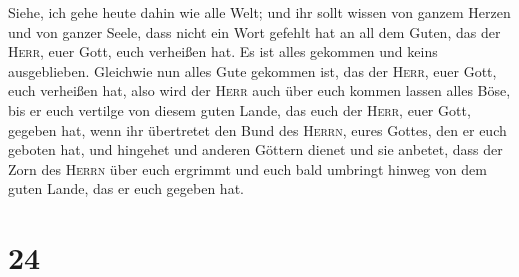 Siehe, ich gehe heute dahin wie alle Welt; und ihr sollt
wissen von ganzem Herzen und von ganzer Seele, dass nicht ein Wort
gefehlt hat an all dem Guten, das der \textsc{Herr}, euer Gott, euch
verheißen hat. Es ist alles gekommen und keins ausgeblieben.
 Gleichwie nun alles Gute gekommen ist, das der
\textsc{Herr}, euer Gott, euch verheißen hat, also wird der
\textsc{Herr} auch über euch kommen lassen alles Böse, bis er euch
vertilge von diesem guten Lande, das euch der \textsc{Herr}, euer Gott,
gegeben hat,  wenn ihr übertretet den Bund des
\textsc{Herrn}, eures Gottes, den er euch geboten hat, und hingehet und
anderen Göttern dienet und sie anbetet, dass der Zorn des \textsc{Herrn}
über euch ergrimmt und euch bald umbringt hinweg von dem guten Lande,
das er euch gegeben hat.

\hypertarget{section-23}{%
\section{24}\label{section-23}}

